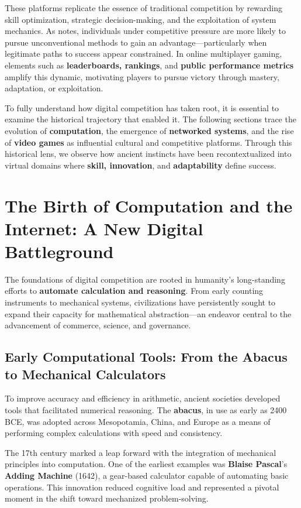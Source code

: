 These platforms replicate the essence of traditional competition by rewarding skill optimization, strategic decision-making, and the exploitation of system mechanics. As \textcite{murdock2001cheating} notes, individuals under competitive pressure are more likely to pursue unconventional methods to gain an advantage—particularly when legitimate paths to success appear constrained. In online multiplayer gaming, elements such as \textbf{leaderboards, rankings}, and \textbf{public performance metrics} amplify this dynamic, motivating players to pursue victory through mastery, adaptation, or exploitation.

To fully understand how digital competition has taken root, it is essential to examine the historical trajectory that enabled it. The following sections trace the evolution of \textbf{computation}, the emergence of \textbf{networked systems}, and the rise of \textbf{video games} as influential cultural and competitive platforms. Through this historical lens, we observe how ancient instincts have been recontextualized into virtual domains where \textbf{skill, innovation}, and \textbf{adaptability} define success.

\section{The Birth of Computation and the Internet: A New Digital Battleground}

The foundations of digital competition are rooted in humanity’s long-standing efforts to \textbf{automate calculation and reasoning}. From early counting instruments to mechanical systems, civilizations have persistently sought to expand their capacity for mathematical abstraction—an endeavor central to the advancement of commerce, science, and governance.

\subsection{Early Computational Tools: From the Abacus to Mechanical Calculators}

To improve accuracy and efficiency in arithmetic, ancient societies developed tools that facilitated numerical reasoning. The \textbf{abacus}, in use as early as 2400 BCE, was adopted across Mesopotamia, China, and Europe as a means of performing complex calculations with speed and consistency.

The 17th century marked a leap forward with the integration of mechanical principles into computation. One of the earliest examples was \textbf{Blaise Pascal}’s \textbf{Adding Machine} (1642), a gear-based calculator capable of automating basic operations. This innovation reduced cognitive load and represented a pivotal moment in the shift toward mechanized problem-solving.

